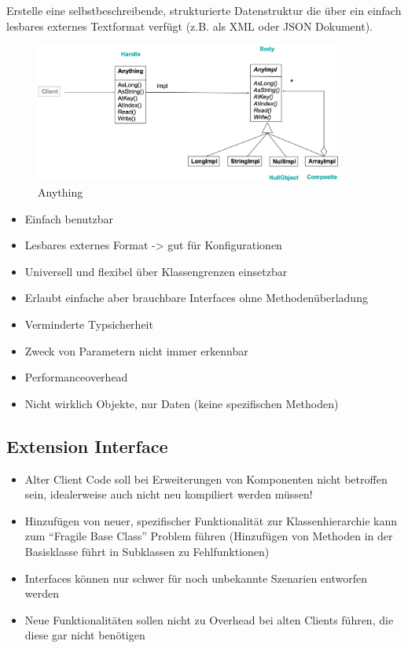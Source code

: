 Erstelle eine selbstbeschreibende, strukturierte Datenstruktur die über ein einfach lesbares externes Textformat verfügt (z.B. als XML oder JSON Dokument).

\begin{figure}[H]
	\centering
	\includegraphics[width=0.9\textwidth]{content/advancedPatterns/images/anything.png}
	\caption{Anything}
\end{figure}

\begin{itemize}
	\item Einfach benutzbar
	\item Lesbares externes Format -> gut für Konfigurationen
	\item Universell und flexibel über Klassengrenzen einsetzbar
	\item Erlaubt einfache aber brauchbare Interfaces ohne Methodenüberladung
	\item Verminderte Typsicherheit
	\item Zweck von Parametern nicht immer erkennbar
	\item Performanceoverhead
	\item Nicht wirklich Objekte, nur Daten (keine spezifischen Methoden)
\end{itemize}

\subsection{Extension Interface}

\begin{itemize}
	\item Alter Client Code soll bei Erweiterungen von Komponenten nicht betroffen sein, idealerweise auch nicht neu kompiliert werden müssen!
	\item Hinzufügen von neuer, spezifischer Funktionalität zur Klassenhierarchie kann zum ``Fragile Base Class'' Problem führen (Hinzufügen von Methoden in der Basisklasse führt in Subklassen zu Fehlfunktionen)
	\item Interfaces können nur schwer für noch unbekannte Szenarien entworfen werden
	\item Neue Funktionalitäten sollen nicht zu Overhead bei alten Clients führen, die diese gar nicht benötigen
\end{itemize}

